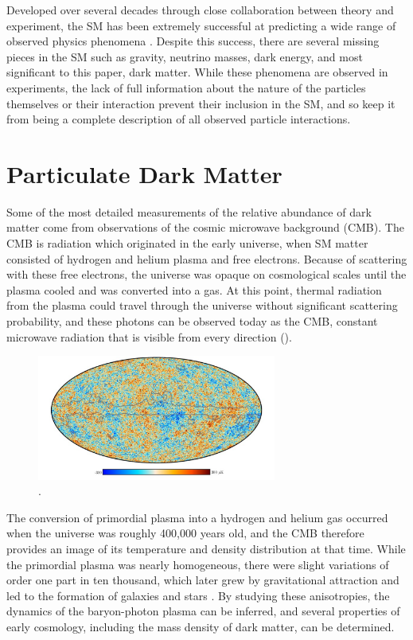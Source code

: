 Developed over several decades through close collaboration between theory and experiment, the SM has been extremely successful at predicting a wide range of observed physics phenomena .
Despite this success, there are several missing pieces in the SM such as gravity, neutrino masses, dark energy, and most significant to this paper, dark matter.
While these phenomena are observed in experiments, the lack of full information about the nature of the particles themselves or their interaction prevent their inclusion in the SM, and so keep it from being a complete description of all observed particle interactions.  

\section{Particulate Dark Matter}


Some of the most detailed measurements of the relative abundance of dark matter come from observations of the cosmic microwave background (CMB).
The CMB is radiation which originated in the early universe, when SM matter consisted of hydrogen and helium plasma and free electrons.
Because of scattering with these free electrons, the universe was opaque on cosmological scales until the plasma cooled and was converted into a gas. 
At this point, thermal radiation from the plasma could travel through the universe without significant scattering probability, and these photons can be observed today as the CMB, constant microwave radiation that is visible from every direction \cite{kurkisuonio} ().

\begin{figure}
	\label{fig:CMB}
	\centering
	\includegraphics[width=0.7\textwidth]{figures/cmb.png}
	\caption[The CMB temperature anisotropy]{\cite{PlanckCMB}.}
\end{figure}

The conversion of primordial plasma into a hydrogen and helium gas occurred when the universe was roughly 400,000 years old, and the CMB therefore provides an image of its temperature and density distribution at that time.
While the primordial plasma was nearly homogeneous, there were slight variations of order one part in ten thousand, which later grew by gravitational attraction and led to the formation of galaxies and stars \cite{Hurki-Suonio}.
By studying these anisotropies, the dynamics of the baryon-photon plasma can be inferred, and several properties of early cosmology, including the mass density of dark matter, can be determined.

